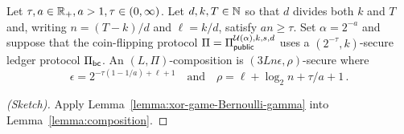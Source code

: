 






\begin{corollary}\label{coro:beacon-Bernoulli}
  Let $\tau, a \in \mathbb{R}_+, a > 1, \tau \in (0, \infty)$. 
  Let $d, k, T \in \mathbb{N}$ 
  so that $d$ divides both $k$ and $T$ and, 
  writing $n = (T - k)/d$ and $\ell = k/d$, 
  satisfy $a n \geq \tau$.
  Set $\alpha = 2^{-a}$ and 
  suppose that the coin-flipping protocol $\Pi = \Pi_\mathsf{public}^{\mathcal{U}(\alpha),k,s,d}$ 
  uses a $(2^{-\tau}, k)$-secure ledger protocol $\Pi_\mathsf{bc}$.
  An $(L, \Pi)$-composition is $(3 L n \epsilon, \rho)$-secure where
  $$
    \epsilon = 2^{- \tau(1 - 1/a) + \ell + 1}
    \quad\text{and} \quad
    \rho = \ell + \log_2 n + \tau/a + 1
    \,.
  $$
\end{corollary}
\begin{proof}[(Sketch)]
  Apply  
  Lemma~\ref{lemma:xor-game-Bernoulli-gamma} into 
  Lemma~\ref{lemma:composition}.
\end{proof}
